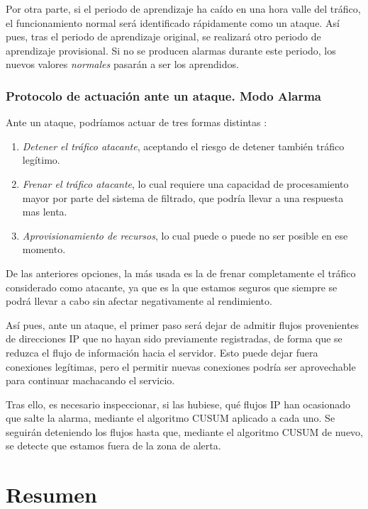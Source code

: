 Por otra parte, si el periodo de aprendizaje ha caído en una hora valle del tráfico, el funcionamiento normal será 
identificado rápidamente como un ataque. Así pues, tras el periodo de aprendizaje original, se realizará otro periodo 
de aprendizaje provisional. Si no se producen alarmas durante este periodo, los nuevos valores \emph{normales} pasarán 
a ser los aprendidos.

\subsubsection{Protocolo de actuación ante un ataque. Modo Alarma}

Ante un ataque, podríamos actuar de tres formas distintas \cite{Raghavan}:
\begin{enumerate}
 \item\emph{Detener el tráfico atacante}, aceptando el riesgo de detener también tráfico legítimo.
 \item\emph{Frenar el tráfico atacante}, lo cual requiere una capacidad de procesamiento mayor por parte del sistema de 
filtrado, que podría llevar a una respuesta mas lenta.
 \item\emph{Aprovisionamiento de recursos}, lo cual puede o puede no ser posible en ese momento.
\end{enumerate}

De las anteriores opciones, la más usada es la de frenar completamente el tráfico considerado como atacante, ya que es 
la que estamos seguros que siempre se podrá llevar a cabo sin afectar negativamente al rendimiento.

Así pues, ante un ataque, el primer paso será dejar de admitir flujos provenientes de direcciones \gls{IP} que no 
hayan sido previamente registradas, de forma que se reduzca el flujo de información hacia el servidor. Esto puede dejar 
fuera conexiones legítimas, pero el permitir nuevas conexiones podría ser aprovechable para continuar machacando el 
servicio.

Tras ello, es necesario inspeccionar, si las hubiese, qué flujos \gls{IP} han ocasionado que salte la alarma, mediante 
el algoritmo \gls{CUSUM} aplicado a cada uno. Se seguirán deteniendo los flujos hasta que, mediante el algoritmo 
\gls{CUSUM} de nuevo, se detecte que estamos fuera de la zona de alerta.

\section{Resumen}%

